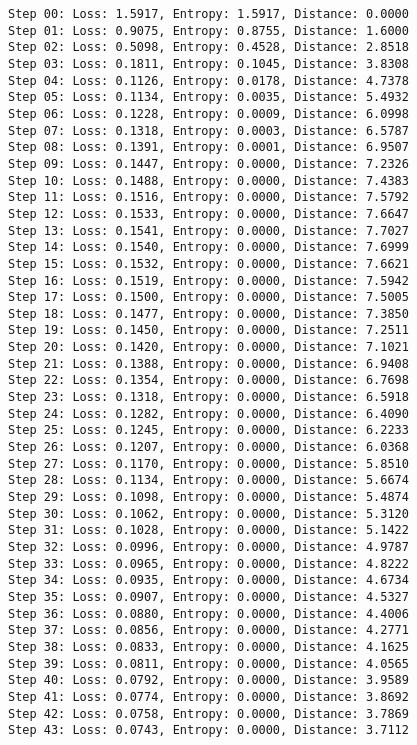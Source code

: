 \documentclass[11pt]{article}
\begin{document}
    \begin{Verbatim}[commandchars=\\\{\}]
Step 00: Loss: 1.5917, Entropy: 1.5917, Distance: 0.0000
Step 01: Loss: 0.9075, Entropy: 0.8755, Distance: 1.6000
Step 02: Loss: 0.5098, Entropy: 0.4528, Distance: 2.8518
Step 03: Loss: 0.1811, Entropy: 0.1045, Distance: 3.8308
Step 04: Loss: 0.1126, Entropy: 0.0178, Distance: 4.7378
Step 05: Loss: 0.1134, Entropy: 0.0035, Distance: 5.4932
Step 06: Loss: 0.1228, Entropy: 0.0009, Distance: 6.0998
Step 07: Loss: 0.1318, Entropy: 0.0003, Distance: 6.5787
Step 08: Loss: 0.1391, Entropy: 0.0001, Distance: 6.9507
Step 09: Loss: 0.1447, Entropy: 0.0000, Distance: 7.2326
Step 10: Loss: 0.1488, Entropy: 0.0000, Distance: 7.4383
Step 11: Loss: 0.1516, Entropy: 0.0000, Distance: 7.5792
Step 12: Loss: 0.1533, Entropy: 0.0000, Distance: 7.6647
Step 13: Loss: 0.1541, Entropy: 0.0000, Distance: 7.7027
Step 14: Loss: 0.1540, Entropy: 0.0000, Distance: 7.6999
Step 15: Loss: 0.1532, Entropy: 0.0000, Distance: 7.6621
Step 16: Loss: 0.1519, Entropy: 0.0000, Distance: 7.5942
Step 17: Loss: 0.1500, Entropy: 0.0000, Distance: 7.5005
Step 18: Loss: 0.1477, Entropy: 0.0000, Distance: 7.3850
Step 19: Loss: 0.1450, Entropy: 0.0000, Distance: 7.2511
Step 20: Loss: 0.1420, Entropy: 0.0000, Distance: 7.1021
Step 21: Loss: 0.1388, Entropy: 0.0000, Distance: 6.9408
Step 22: Loss: 0.1354, Entropy: 0.0000, Distance: 6.7698
Step 23: Loss: 0.1318, Entropy: 0.0000, Distance: 6.5918
Step 24: Loss: 0.1282, Entropy: 0.0000, Distance: 6.4090
Step 25: Loss: 0.1245, Entropy: 0.0000, Distance: 6.2233
Step 26: Loss: 0.1207, Entropy: 0.0000, Distance: 6.0368
Step 27: Loss: 0.1170, Entropy: 0.0000, Distance: 5.8510
Step 28: Loss: 0.1134, Entropy: 0.0000, Distance: 5.6674
Step 29: Loss: 0.1098, Entropy: 0.0000, Distance: 5.4874
Step 30: Loss: 0.1062, Entropy: 0.0000, Distance: 5.3120
Step 31: Loss: 0.1028, Entropy: 0.0000, Distance: 5.1422
Step 32: Loss: 0.0996, Entropy: 0.0000, Distance: 4.9787
Step 33: Loss: 0.0965, Entropy: 0.0000, Distance: 4.8222
Step 34: Loss: 0.0935, Entropy: 0.0000, Distance: 4.6734
Step 35: Loss: 0.0907, Entropy: 0.0000, Distance: 4.5327
Step 36: Loss: 0.0880, Entropy: 0.0000, Distance: 4.4006
Step 37: Loss: 0.0856, Entropy: 0.0000, Distance: 4.2771
Step 38: Loss: 0.0833, Entropy: 0.0000, Distance: 4.1625
Step 39: Loss: 0.0811, Entropy: 0.0000, Distance: 4.0565
Step 40: Loss: 0.0792, Entropy: 0.0000, Distance: 3.9589
Step 41: Loss: 0.0774, Entropy: 0.0000, Distance: 3.8692
Step 42: Loss: 0.0758, Entropy: 0.0000, Distance: 3.7869
Step 43: Loss: 0.0743, Entropy: 0.0000, Distance: 3.7112

\end{Verbatim}
\end{document}

